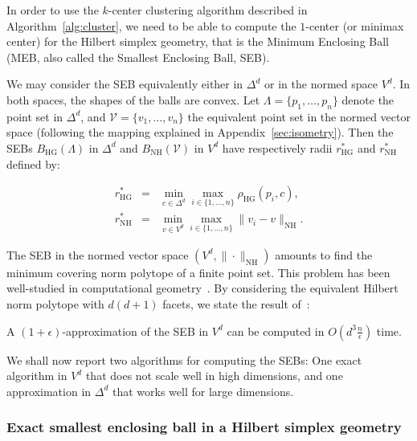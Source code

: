 \documentclass[graybox]{svmult}
\def\calV{\mathcal{V}}
\def\HG{\mathrm{HG}}
\def\NH{\mathrm{NH}}  %
\begin{document}
In order to use the $k$-center clustering algorithm described in Algorithm~\ref{alg:cluster},
we need to be able to compute the $1$-center (or minimax center) for the Hilbert simplex geometry,
that is the Minimum Enclosing Ball (MEB, also called the Smallest Enclosing Ball, SEB).

We may consider the SEB equivalently either in $\Delta^d$ or in the normed space $V^d$.
In both spaces, the shapes of the balls are convex.
Let $\Lambda=\{p_1,\ldots,p_n\}$ denote the point set in $\Delta^d$,
and $\calV=\{v_1,\ldots,v_n\}$ the equivalent point set in the normed vector space
(following the mapping explained in Appendix~\ref{sec:isometry}).
Then the SEBs $B_\HG(\Lambda)$ in $\Delta^d$ and $B_\NH(\calV)$ in $V^d$ have respectively radii $r^*_\HG$ and $r_\NH^*$ defined by:

\begin{eqnarray*}
r^*_\HG &=& \min_{c\in\Delta^d}  \max_{i\in\{1,\ldots, n\}} \rho_\HG(p_i,c),\\
r^*_\NH &=& \min_{v\in V^d}      \max_{i\in\{1,\ldots, n\}} \|v_i-v\|_\NH.
\end{eqnarray*}


The SEB in the normed vector space $(V^d,\|\cdot\|_\NH)$ amounts to find the minimum covering norm polytope  of a finite point set.
This problem has been well-studied in computational geometry~\cite{Saha-2011,Brandenberg-2013,EnclosingPolytope-2004}.
By considering the equivalent Hilbert norm polytope with $d(d+1)$ facets, we state the result of~\cite{Saha-2011}:

\begin{theorem}
A $(1+\epsilon)$-approximation of the SEB in $V^d$ can be computed in $O(d^3\frac{n}{\epsilon})$ time.
\end{theorem}

We shall now report two algorithms for computing the SEBs: One exact algorithm in $V^d$ that does not scale well in high dimensions,
and one approximation in $\Delta^d$ that works well for large dimensions.

\subsubsection{Exact smallest enclosing ball in a Hilbert simplex geometry\label{sec:SEBHSG}} 
\end{document}
